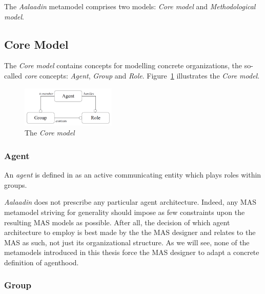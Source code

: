 The \textit{Aalaadin} metamodel comprises two models: \textit{Core model} and \textit{Methodological model}.

\subsection{Core Model}

The \textit{Core model} contains concepts for modelling concrete organizations, the so-called \textit{core} concepts: \textit{Agent}, \textit{Group} and \textit{Role}.
Figure~\ref{figure:aalaadin-core-model} illustrates the \textit{Core model}.

\begin{figure}[h]
	\centering
	\includegraphics[width=0.4\textwidth]{images/aalaadin/core-model.png}
	\caption{The \textit{Core model} \cite{Ferber97}}
	\label{figure:aalaadin-core-model}
\end{figure}

\subsubsection*{Agent}

An \textit{agent} is defined in \cite{Ferber97} as an active communicating entity which plays roles within groups.

\textit{Aalaadin} does not prescribe any particular agent architecture.
Indeed, any MAS metamodel striving for generality should impose as few constraints upon the resulting MAS models as possible.
After all, the decision of which agent architecture to employ is best made by the the MAS designer and relates to the MAS as such, not just its organizational structure.
As we will see, none of the metamodels introduced in this thesis force the MAS designer to adapt a concrete definition of agenthood.

\subsubsection*{Group}

